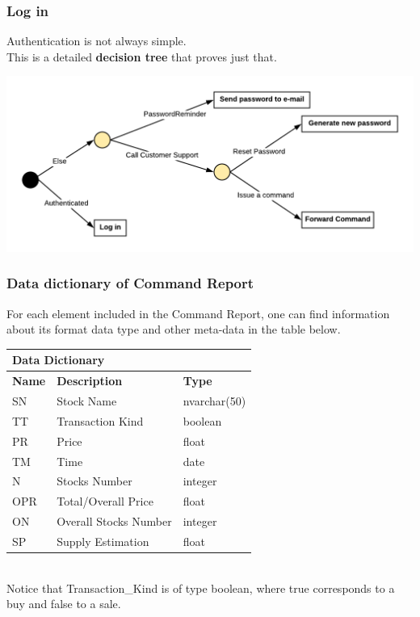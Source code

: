 \documentclass{article}
\begin{document}
\subsubsection{Log in}
Authentication is not always simple.\\
This is a detailed \textbf{decision tree} that proves just that.\\
\begin{center}
\hspace*{5mm}\includegraphics[scale=0.4]{decisionTree}
\end{center} 

\subsubsection{Data dictionary of Command Report}
For each element included in the Command Report, one can find information about
its format data type and other meta-data in the table below. 
\begin{table}[htbp]
\begin{tabular}{|l|l|l|}
\hline
\multicolumn{3}{|l|}{\Large \textbf{Data Dictionary}}      \\ \hline
\textbf{Name}  & \textbf{Description}           & \textbf{Type}         \\ \hline
SN  & Stock Name            & nvarchar(50) \\ \hline
TT  & Transaction Kind      & boolean      \\ \hline
PR  & Price                 & float        \\ \hline
TM  & Time                  & date         \\ \hline
N   & Stocks Number         & integer      \\ \hline
OPR & Total/Overall Price   & float        \\ \hline
ON  & Overall Stocks Number & integer      \\ \hline
SP  & Supply Estimation     & float        \\ \hline
\end{tabular}
\end{table}\\
Notice that Transaction\_Kind is of type boolean, where true corresponds to a buy and false to a sale. 
\end{document}

